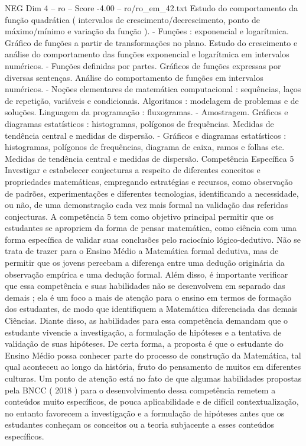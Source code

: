 \begin{textsample}{NEG Dim 4 – ro – Score -4.00 – ro/ro\_em\_42.txt}
Estudo do comportamento da função quadrática ( intervalos de crescimento/decrescimento, ponto de máximo/mínimo e variação da função ). - Funções : exponencial e logarítmica.
Gráfico de funções a partir de transformações no plano.
Estudo do crescimento e análise do comportamento das funções exponencial e logarítmica em intervalos numéricos. - Funções definidas por partes.
Gráficos de funções expressas por diversas sentenças.
Análise do comportamento de funções em intervalos numéricos. - Noções elementares de matemática computacional : sequências, laços de repetição, variáveis e condicionais.
Algoritmos : modelagem de problemas e de soluções.
Linguagem da programação : fluxogramas. - Amostragem.
Gráficos e diagramas estatísticos : histogramas, polígonos de frequências.
Medidas de tendência central e medidas de dispersão. - Gráficos e diagramas estatísticos : histogramas, polígonos de frequências, diagrama de caixa, ramos e folhas etc.
Medidas de tendência central e medidas de dispersão.
Competência Específica 5 Investigar e estabelecer conjecturas a respeito de diferentes conceitos e propriedades matemáticas, empregando estratégias e recursos, como observação de padrões, experimentações e diferentes tecnologias, identificando a necessidade, ou não, de uma demonstração cada vez mais formal na validação das referidas conjecturas.
A competência 5 tem como objetivo principal permitir que os estudantes se apropriem da forma de pensar matemática, como ciência com uma forma específica de validar suas conclusões pelo raciocínio lógico-dedutivo.
Não se trata de trazer para o Ensino Médio a Matemática formal dedutiva, mas de permitir que os jovens percebam a diferença entre uma dedução originária da observação empírica e uma dedução formal.
Além disso, é importante verificar que essa competência e suas habilidades não se desenvolvem em separado das demais ; ela é um foco a mais de atenção para o ensino em termos de formação dos estudantes, de modo que identifiquem a Matemática diferenciada das demais Ciências.
Diante disso, as habilidades para essa competência demandam que o estudante vivencie a investigação, a formulação de hipóteses e a tentativa de validação de suas hipóteses.
De certa forma, a proposta é que o estudante do Ensino Médio possa conhecer parte do processo de construção da Matemática, tal qual aconteceu ao longo da história, fruto do pensamento de muitos em diferentes culturas.
Um ponto de atenção está no fato de que algumas habilidades propostas pela BNCC ( 2018 ) para o desenvolvimento dessa competência remetem a conteúdos muito específicos, de pouca aplicabilidade e de difícil contextualização, no entanto favorecem a investigação e a formulação de hipóteses antes que os estudantes conheçam os conceitos ou a teoria subjacente a esses conteúdos específicos.

\end{textsample}
